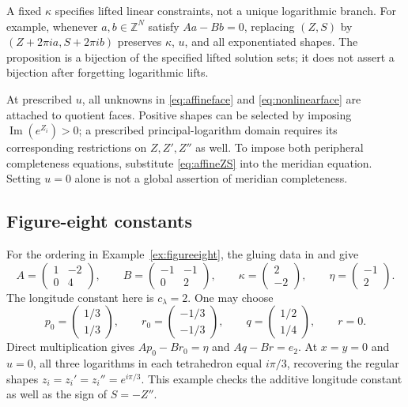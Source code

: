 \documentclass[11pt]{article}
\theoremstyle{definition}\newtheorem{definition}[theorem]{Definition}
\theoremstyle{remark}\newtheorem{remark}[theorem]{Remark}
\newcommand{\Z}{\mathbb Z}
\begin{document}
A fixed $\kappa$ specifies lifted linear constraints, not a unique logarithmic branch. For example, whenever $a,b\in\Z^N$ satisfy $Aa-Bb=0$, replacing $(Z,S)$ by $(Z+2\pi i a,S+2\pi i b)$ preserves $\kappa$, $u$, and all exponentiated shapes. The proposition is a bijection of the specified lifted solution sets; it does not assert a bijection after forgetting logarithmic lifts.

At prescribed $u$, all unknowns in \eqref{eq:affineface} and \eqref{eq:nonlinearface} are attached to quotient faces. Positive shapes can be selected by imposing $\operatorname{Im}(e^{Z_i})>0$; a prescribed principal-logarithm domain requires its corresponding restrictions on $Z,Z',Z''$ as well. To impose both peripheral completeness equations, substitute \eqref{eq:affineZS} into the meridian equation. Setting $u=0$ alone is not a global assertion of meridian completeness.

\subsection{Figure-eight constants}
For the ordering in Example~\ref{ex:figureeight}, the gluing data in \cite[Figure~4]{BGW} and \cite[Section~2]{RIMS} give
\[
A=\begin{pmatrix}1&-2\\0&4\end{pmatrix},\qquad
B=\begin{pmatrix}-1&-1\\0&2\end{pmatrix},\qquad
\kappa=\begin{pmatrix}2\\-2\end{pmatrix},\qquad
\eta=\begin{pmatrix}-1\\2\end{pmatrix}.
\]
The longitude constant here is $c_\lambda=2$. One may choose
\[
p_0=\begin{pmatrix}1/3\\1/3\end{pmatrix},\qquad
r_0=\begin{pmatrix}-1/3\\-1/3\end{pmatrix},\qquad
q=\begin{pmatrix}1/2\\1/4\end{pmatrix},\qquad r=0.
\]
Direct multiplication gives $Ap_0-Br_0=\eta$ and $Aq-Br=e_2$. At $x=y=0$ and $u=0$, all three logarithms in each tetrahedron equal $i\pi/3$, recovering the regular shapes $z_i=z_i'=z_i''=e^{i\pi/3}$. This example checks the additive longitude constant as well as the sign of $S=-Z''$.
\end{document}
